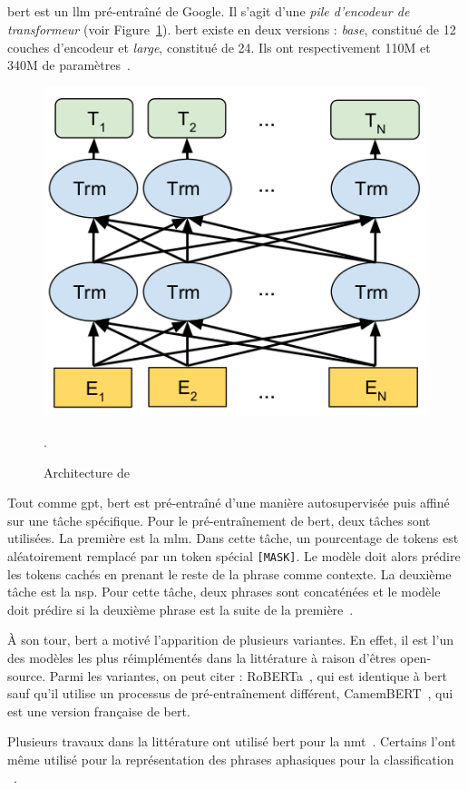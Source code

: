 \subsection{}

\Gls{bert} est un \gls{llm} pré-entraîné de Google.
Il s'agit d'une \emph{pile d'encodeur de transformeur} (voir Figure~\ref{fig.bert}).
\gls{bert} existe en deux versions : 
\emph{base}, constitué de 12 couches d'encodeur et \emph{large}, constitué de 24. 
Ils ont respectivement 110M et 340M de paramètres~\cite{Devlin_Chang_Lee_Toutanova_2019}.

\begin{figure}[hbt]
    \centering
    \includegraphics[width=.6\linewidth]{assets/images/bert.png}
    \caption[Architecture de .]%
    {Architecture de ~\cite{Devlin_Chang_Lee_Toutanova_2019}}.
    \label{fig.bert}
\end{figure}

Tout comme \gls{gpt}, \gls{bert} est pré-entraîné d'une manière autosupervisée
puis affiné sur une tâche spécifique.
Pour le pré-entraînement de \gls{bert}, deux tâches sont utilisées.
La première est la \gls{mlm}.
Dans cette tâche, un pourcentage de tokens est aléatoirement remplacé par un token spécial \texttt{[MASK]}.
Le modèle doit alors prédire les tokens cachés en prenant le reste de la phrase comme contexte.
La deuxième tâche est la \gls{nsp}.
Pour cette tâche, deux phrases sont concaténées 
et le modèle doit prédire si la deuxième phrase est la suite de la première~\cite{Devlin_Chang_Lee_Toutanova_2019}.

À son tour, \gls{bert} a motivé l'apparition de plusieurs variantes.
En effet, il est l'un des modèles les plus réimplémentés dans la littérature à raison d'êtres open-source.
Parmi les variantes, on peut citer :
RoBERTa~\cite{Liu_Ott_Goyal_Du_Joshi_Chen_Levy_Lewis_Zettlemoyer_Stoyanov_2019},
qui est identique à \gls{bert} sauf qu'il utilise un processus de pré-entraînement différent,
CamemBERT~\cite{Martin_Muller_Ortiz_Suárez_Dupont_Romary_de_la_Clergerie_Seddah_Sagot_2020},
qui est une version française de \gls{bert}.

Plusieurs travaux dans la littérature ont utilisé \gls{bert}
pour la \gls{nmt}~\cite{Clinchant_Jung_Nikoulina_2019,Zhu_Xia_Wu_He_Qin_Zhou_Li_Liu_2020}.
Certains l'ont même utilisé pour la représentation des phrases aphasiques pour la classification%
~\cite{Qin_Lee_Kong_Lin_2022}.


